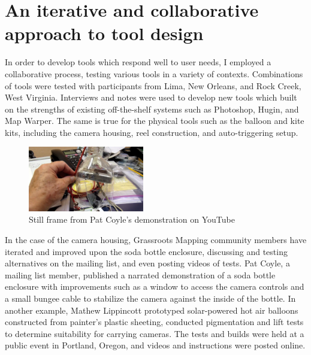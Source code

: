 \documentclass[11pt,oneside,notitlepage]{report}
\begin{document}
{{\section{An iterative and collaborative approach to tool design}

In order to develop tools which respond well to user needs, I employed a collaborative process, testing various tools in a variety of contexts. Combinations of tools were tested with participants from Lima, New Orleans, and Rock Creek, West Virginia. Interviews and notes were used to develop new tools which built on the strengths of existing off-the-shelf systems such as Photoshop, Hugin, and Map Warper. The same is true for the physical tools such as the balloon and kite kits, including the camera housing, reel construction, and auto-triggering setup. 

\begin{figure}
	\begin{flushright}
		\includegraphics[width=0.45\textwidth]{images/pat-coyle-video.png}
		\caption{Still frame from Pat Coyle's demonstration on YouTube \cite{coyle2010sodabottle}}
	\end{flushright}
\end{figure}

In the case of the camera housing, Grassroots Mapping community members have iterated and improved upon the soda bottle enclosure, discussing and testing alternatives on the mailing list, and even posting videos of tests. Pat Coyle, a mailing list member, published a narrated demonstration of a soda bottle enclosure with improvements such as a window to access the camera controls and a small bungee cable to stabilize the camera against the inside of the bottle. In another example, Mathew Lippincott prototyped solar-powered hot air balloons constructed from painter's plastic sheeting, conducted pigmentation and lift tests to determine suitability for carrying cameras. The tests and builds were held at a public event in Portland, Oregon, and videos and instructions were posted online.

}}
\end{document}
